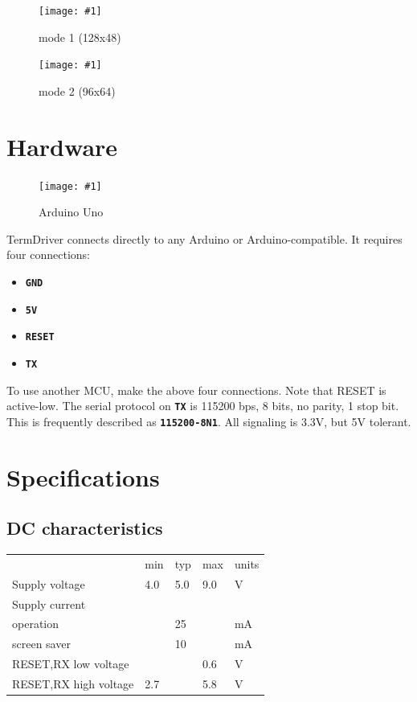 \documentclass{article}
\newcommand{\heavyline}{\specialrule{1pt}{1pt}{1pt}}
\newcommand{\png}[2]{
\begin{figure}[H]
\begin{center}
\texttt{[image: \#1]}
\caption{#2}
\end{center}
\end{figure}
}
\newcommand{\mach}[1]{\texttt{\textbf{#1}}}
\begin{document}
\png{img/termdriver/moby1}{mode 1 (128x48)}
\png{img/termdriver/moby2}{mode 2 (96x64)}

\newpage
\section{Hardware}

\png{img/arduino}{Arduino Uno}

TermDriver connects directly to any Arduino or Arduino-compatible.
It requires four connections:

\begin{itemize}
\item \mach{GND}
\item \mach{5V}
\item \mach{RESET}
\item \mach{TX}
\end{itemize}

\noindent
To use another MCU, make the above four connections. Note that RESET is active-low.
The serial protocol on \mach{TX} is 115200 bps, 8 bits, no parity, 1 stop bit.
This is frequently described as \mach{115200-8N1}.
All signaling is 3.3V, but 5V tolerant.

\newpage
\hypertarget{technical-specifications}{}
\hypertarget{technical-specifications}{%
\section{Specifications}\label{electrical-characteristics}}

\subsection{DC characteristics}
\vspace{10 pt}
{\renewcommand{\arraystretch}{1.2}%

\begin{tabularx}{\linewidth}{XC{45pt}C{45pt}C{45pt}C{45pt}}
\heavyline
& min & typ & max & units \\ \heavyline

Supply voltage & 4.0 & 5.0 & 9.0 & V \\ \hline

Supply current & & & & \\
\hspace{10pt} operation & & 25 & & mA \\
\hspace{10pt} screen saver & & 10 & & mA \\ \hline

RESET,RX low voltage & & & 0.6 & V \\ \hline
RESET,RX high voltage & 2.7 &   & 5.8 & V \\ \hline
\end{tabularx}}
\vspace{10 pt}
\end{document}
